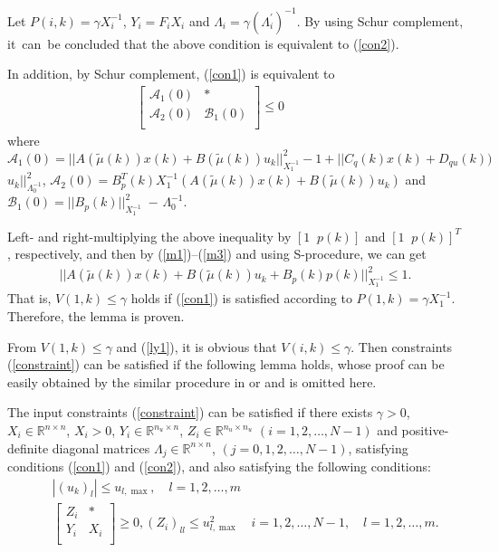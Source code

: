 \documentclass{singlecol-new}
\theoremstyle{TH}{
\newtheorem{lemma}{Lemma}
\newtheorem{theorem}[lemma]{Theorem}
\newtheorem{corrolary}[lemma]{Corrolary}
\newtheorem{conjecture}[lemma]{Conjecture}
\newtheorem{proposition}[lemma]{Proposition}
\newtheorem{claim}[lemma]{Claim}
\newtheorem{stheorem}[lemma]{Wrong Theorem}
\newtheorem{algorithm}{Algorithm}
}
\theoremstyle{THrm}{
\newtheorem{definition}{Definition}[section]
\newtheorem{question}{Question}[section]
\newtheorem{remark}{Remark}
\newtheorem{scheme}{Scheme}
}
\theoremstyle{THhit}{
\newtheorem{case}{Case}[section]
}
\begin{document}
Let $P(i,k) = \gamma X_i^{-1} $, $Y_i  = F_i X_i $
 and $ \Lambda _{i }  = \gamma (\Lambda _{i }^{\prime})^{-1}$. By using Schur complement, it~can~be
concluded that the above condition is equivalent to (\ref{con2}).

In addition, by Schur complement, (\ref{con1}) is equivalent to
\begin{eqnarray}
\left[ {\begin{array}{cc}
   \mathscr{A}_1(0)&  *   \\
   \mathscr{A}_2(0)& \mathscr{B}_1(0)   \\
\end{array}} \right] \le 0\hspace{4em}\nonumber
\end{eqnarray}
where \h{$\mathscr{A}_1(0)=||A(\tilde \mu(k))x(k) + B(\tilde \mu
(k))u_k ||^2_{ X_1^{ - 1}} - 1 + ||C_q (k)x(k) + D_{qu}(k))$} $u_k
||^2_{\Lambda _0^{-1}}$, \h{$\mathscr{A}_2(0)=B_p^T (k)X_1^{ - 1}
(A(\tilde \mu (k)) x(k)+ B(\tilde \mu (k))u_k )$ and
$\mathscr{B}_1(0)=||B_p(k)||^2_{X_1^{ - 1}}$}~$-$ $\Lambda _0^{-1}$.

Left- and right-multiplying the above inequality by $[1 \;\; p(k)]$
and $[1 \;\; p(k)]^T$, respectively, and then by
(\ref{m1})--(\ref{m3}) and using S-procedure, we can get
\begin{eqnarray}
||A(\tilde \mu (k))x(k) + B(\tilde \mu (k))u_k  + B_p
(k)p(k)||^2_{X_1^{ - 1}} \le 1. \nonumber
\end{eqnarray}
That is, $V(1,k)\leq \gamma$ holds if (\ref{con1}) is satisfied
according to $P(1,k) = \gamma X_1^{ - 1} $. Therefore, the lemma is
proven.
\endproof

\noindent From $V(1,k)\leq\gamma$ and (\ref{ly1}), it is obvious
that $V(i,k)\leq\gamma$. Then constraints (\ref{constraint}) can be
satisfied if the following lemma holds, whose proof can be easily
obtained by the similar procedure in \cite{Kothare} or
\cite{li2009constrained} and is omitted here.

\begin{lemma}
The input constraints {\rm (\ref{constraint})} can be satisfied if
there exists $\gamma  > 0$, $X_i  \in \mathbb{R}^{n \times n} $,
$X_i  > 0$, $Y_i \in \mathbb{R}^{n_u  \times n} $, $Z_i \in
\mathbb{R}^{n_u \times n_u} $ $(i = 1,2, \ldots, N - 1)$ and
positive-definite diagonal matrices $\Lambda _j \in \mathbb{R}^{n
\times n}$, $(j = 0,1,2, \ldots ,N - 1)$, satisfying conditions {\rm
(\ref{con1}) and (\ref{con2})}, and also satisfying the following
conditions:
\begin{eqnarray}\label{con3}
&&\left| {(u_k )_l } \right| \leq u_{l,\max},\quad l = 1,2, \ldots
,m\\\label{con4} &&\left[ {\begin{array}{cc}
   {Z_i } &  *   \\
   {Y_i } & {X_i }  \\
 \end{array} } \right] \ge 0,(Z_i )_{ll}  \leq u_{l,\max }^2 \quad i = 1,2, \ldots, N-1, \quad l = 1,2, \ldots, m.
\end{eqnarray}
\end{lemma}
\end{document}
